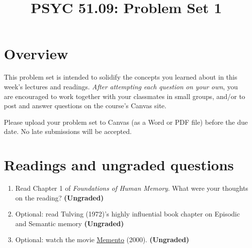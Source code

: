 \documentclass[11pt]{article}
\title{PSYC 51.09: Problem Set 1}
\date{}
\begin{document}
\maketitle
\vspace{-0.75in}
\section*{Overview}
This problem set is intended to solidify the concepts you learned
about in this week's lectures and readings.  \textit{After attempting
each question on your own}, you are encouraged
to work together with your classmates in small groups, and/or to post
and answer questions on the course’s Canvas site.

Please upload your problem set to Canvas (as a Word or PDF file)
before the due date.  No late submissions will be accepted.

\section*{Readings and ungraded questions}
\begin{enumerate}
\item Read Chapter 1 of \textit{Foundations of Human Memory}.  What were your thoughts on the reading?
  \textbf{(Ungraded)}

\item Optional: read Tulving (1972)'s highly influential book chapter
  on Episodic and Semantic memory
  \textbf{(Ungraded)}

\item Optional: watch the movie \underline{Memento} (2000).  \textbf{(Ungraded)}
\end{enumerate}
\end{document}
